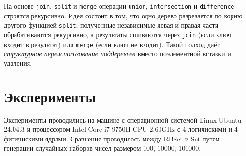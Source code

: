 \documentclass[a4paper]{article}
\begin{document}
На основе \texttt{join}, \texttt{split} и \texttt{merge} операции
\texttt{union}, \texttt{intersection} и \texttt{difference} строятся
рекурсивно. Идея состоит в том, что одно дерево разрезается по корню другого
функцией \texttt{split}; полученные независимые левая и правая части
обрабатываются рекурсивно, а результаты сшиваются через \texttt{join} (если
ключ входит в результат) или \texttt{merge} (если ключ не входит). Такой подход
даёт \emph{структурное переиспользование поддеревьев} вместо поэлементной
вставки и удаления.


\section{Эксперименты}

Эксперименты проводились на машине с операционной системой Linux Ubuntu 24.04.3 и процессором Intel Core i7-9750H CPU 2.60GHz с 4 логичискими и 4 физичискими ядрами.
Сравнение проводилось между RBSet и Set путем генерации случайных наборов чисел размером 100, 10000, 100000.
\end{document}
